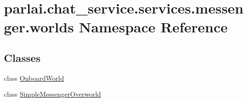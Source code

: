 \hypertarget{namespaceparlai_1_1chat__service_1_1services_1_1messenger_1_1worlds}{}\section{parlai.\+chat\+\_\+service.\+services.\+messenger.\+worlds Namespace Reference}
\label{namespaceparlai_1_1chat__service_1_1services_1_1messenger_1_1worlds}
\subsection*{Classes}
\begin{DoxyCompactItemize}
\item 
class \hyperlink{classparlai_1_1chat__service_1_1services_1_1messenger_1_1worlds_1_1OnboardWorld}{Onboard\+World}
\item 
class \hyperlink{classparlai_1_1chat__service_1_1services_1_1messenger_1_1worlds_1_1SimpleMessengerOverworld}{Simple\+Messenger\+Overworld}
\end{DoxyCompactItemize}
